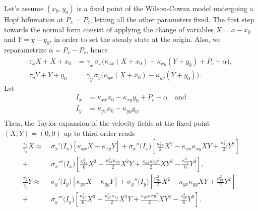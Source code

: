 Let's assume $(x_0,y_0)$ is a fixed point of the Wilson-Cowan model undergoing
a Hopf bifurcation at $P_x=P_c$, letting all the other parameters fixed.
The first step towards the normal form consist of applying
the change of variables $X=x-x_0$ and $Y=y-y_0$, in order to set the
steady state at the origin. Also, we reparametrize $\alpha = P_x-P_c$,
hence
\begin{equation}
    \begin{aligned}
  \tau_x \dot{X}+X+x_0 &= \gamma_x\,\sigma_x\!\bigl(\kappa_{xx}(X+x_0) - \kappa_{xy}(Y+y_0) + P_c + \alpha \bigr),\\
  \tau_y \dot{Y}+Y+y_0 &= \gamma_y\,\sigma_y\!\bigl(\kappa_{yx}(X+x_0) - \kappa_{yy}(Y+y_0)\bigr).
\end{aligned}
\end{equation}
Let 
\begin{equation}
    \begin{aligned}
    I_x &= \kappa_{xx}x_0 - \kappa_{xy}y_0 + P_c + \alpha \quad\text{and}\\
    I_y &= \kappa_{yx}x_0 - \kappa_{yy}y_0. \\
    \end{aligned}
\end{equation}
Then, the Taylor expansion of the velocity fields at the fixed point $(X,Y)=(0,0)$ up to third order reads
\begin{equation}\label{eq:taylor}
    \begin{aligned}
  \frac{\tau_x}{\gamma_x} \dot{X} \approx \;&
  \sigma_x'\!\bigl(I_x \bigr)\left[\kappa_{xx}X - \kappa_{xy}Y\right] + 
  \sigma_x''\!\bigl(I_x \bigr)\left[\frac{\kappa_{xx}^2}{2}X^2 - \kappa_{xx}\kappa_{xy}XY + \frac{\kappa_{xy}^2}{2} Y^2\right] \\
  +\; & \sigma_x'''\!\bigl(I_x \bigr)
  \left[
  \frac{\kappa_{xx}^3}{6}X^3-
  \frac{\kappa_{xx}^2\kappa_{xy}}{2}X^2Y+
  \frac{\kappa_{xx}\kappa{xy}^2}{2}XY^2-
  \frac{\kappa_{xy}^3}{6}Y^3
  \right],\\
  \frac{\tau_y}{\gamma_y} \dot{Y} \approx \;&
  \sigma_y'\!\bigl(I_y \bigr)\left[\kappa_{yx}X - \kappa_{yy}Y\right] + 
  \sigma_y''\!\bigl(I_y \bigr)\left[\frac{\kappa_{yx}^2}{2}X^2 - \kappa_{yx}\kappa_{yy}XY + \frac{\kappa_{yy}^2}{2} Y^2\right] \\
  +\; & \sigma_y'''\!\bigl(I_y \bigr)
  \left[
  \frac{\kappa_{yx}^3}{6}X^3-
  \frac{\kappa_{yx}^2\kappa_{xy}}{2}X^2Y+
  \frac{\kappa_{yx}\kappa{xy}^2}{2}XY^2-
  \frac{\kappa_{yy}^3}{6}Y^3
  \right].
\end{aligned}
\end{equation}
